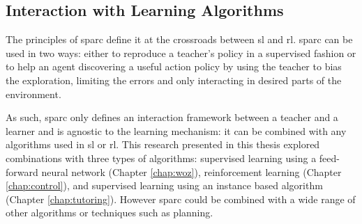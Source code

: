 

\subsection{Interaction with Learning Algorithms}

The principles of \gls{sparc} define it at the crossroads between \gls{sl} and \gls{rl}. \gls{sparc} can be used in two ways: either to reproduce a teacher's policy in a supervised fashion or to help an agent discovering a useful action policy by using the teacher to bias the exploration, limiting the errors and only interacting in desired parts of the environment.

As such, \gls{sparc} only defines an interaction framework between a teacher and a learner and is agnostic to the learning mechanism: it can be combined with any algorithms used in \gls{sl} or \gls{rl}. This research presented in this thesis explored combinations with three types of algorithms: supervised learning using a feed-forward neural network (Chapter \ref{chap:woz}), reinforcement learning (Chapter \ref{chap:control}), and supervised learning using an instance based algorithm (Chapter \ref{chap:tutoring}). However \gls{sparc} could be combined with a wide range of other algorithms or techniques such as planning.


